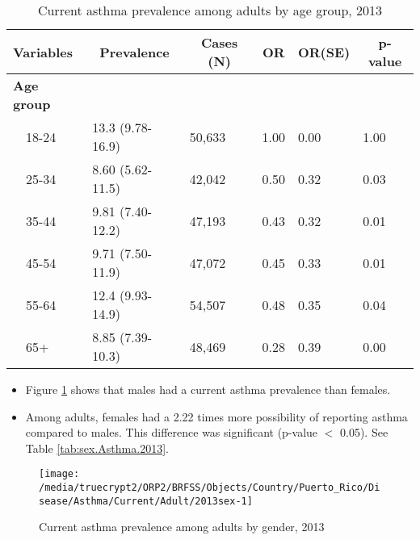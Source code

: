 \begin{table}[H]
\caption{Current asthma prevalence  among adults by age group, 2013\label{tab:age.Asthma.2013}} 
\begin{center}
\begin{tabular}{llllll}
\hline\hline
\multicolumn{1}{l}{Variables}&\multicolumn{1}{c}{Prevalence}&\multicolumn{1}{c}{Cases (N)}&\multicolumn{1}{c}{OR}&\multicolumn{1}{c}{OR(SE)}&\multicolumn{1}{c}{p-value}\tabularnewline
\hline
{\bfseries Age group}&&&&&\tabularnewline
~~18-24&13.3 (9.78-16.9)&50,633&1.00&0.00&1.00\tabularnewline
~~25-34&8.60 (5.62-11.5)&42,042&0.50&0.32&0.03\tabularnewline
~~35-44&9.81 (7.40-12.2)&47,193&0.43&0.32&0.01\tabularnewline
~~45-54&9.71 (7.50-11.9)&47,072&0.45&0.33&0.01\tabularnewline
~~55-64&12.4 (9.93-14.9)&54,507&0.48&0.35&0.04\tabularnewline
~~65+&8.85 (7.39-10.3)&48,469&0.28&0.39&0.00\tabularnewline
\hline
\end{tabular}\end{center}

\end{table}


\newpage
\begin{itemize}

\item Figure \ref{fig:sex.Asthma.2013} shows that males had a 
current asthma prevalence than females.


\item Among adults, females had a 2.22 times more possibility of reporting asthma compared to males. This difference was significant (p-value $<$ 0.05). See Table \ref{tab:sex.Asthma.2013}.

\end{itemize}

\begin{figure}[H]
\caption{Current asthma prevalence among adults by gender, 
2013}
\begin{knitrout}
\color{fgcolor}

{\centering \texttt{[image: /media/truecrypt2/ORP2/BRFSS/Objects/Country/Puerto\_Rico/Disease/Asthma/Current/Adult/2013sex-1]} 

}



\end{knitrout}
\label{fig:sex.Asthma.2013}
\end{figure}

